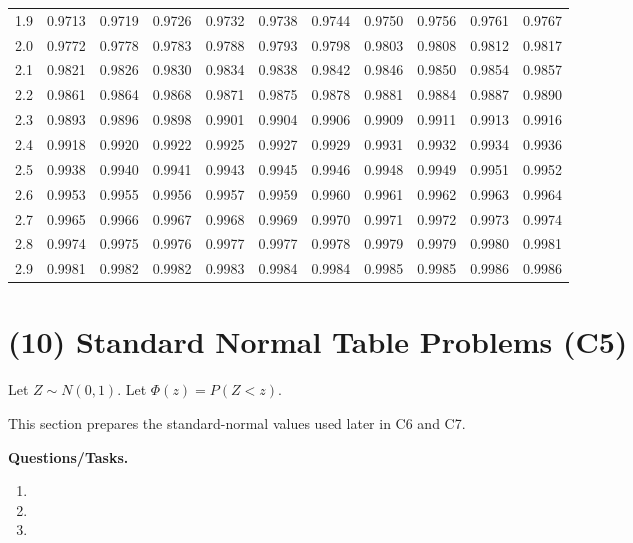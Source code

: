 \begin{center}
\begin{tabular}{c|cccccccccc}
		1.9 & 0.9713 & 0.9719 & 0.9726 & 0.9732 & 0.9738 & 0.9744 & 0.9750 & 0.9756 & 0.9761 & 0.9767\\
		2.0 & 0.9772 & 0.9778 & 0.9783 & 0.9788 & 0.9793 & 0.9798 & 0.9803 & 0.9808 & 0.9812 & 0.9817\\
		2.1 & 0.9821 & 0.9826 & 0.9830 & 0.9834 & 0.9838 & 0.9842 & 0.9846 & 0.9850 & 0.9854 & 0.9857\\
		2.2 & 0.9861 & 0.9864 & 0.9868 & 0.9871 & 0.9875 & 0.9878 & 0.9881 & 0.9884 & 0.9887 & 0.9890\\
		2.3 & 0.9893 & 0.9896 & 0.9898 & 0.9901 & 0.9904 & 0.9906 & 0.9909 & 0.9911 & 0.9913 & 0.9916\\
		2.4 & 0.9918 & 0.9920 & 0.9922 & 0.9925 & 0.9927 & 0.9929 & 0.9931 & 0.9932 & 0.9934 & 0.9936\\
		2.5 & 0.9938 & 0.9940 & 0.9941 & 0.9943 & 0.9945 & 0.9946 & 0.9948 & 0.9949 & 0.9951 & 0.9952\\
		2.6 & 0.9953 & 0.9955 & 0.9956 & 0.9957 & 0.9959 & 0.9960 & 0.9961 & 0.9962 & 0.9963 & 0.9964\\
		2.7 & 0.9965 & 0.9966 & 0.9967 & 0.9968 & 0.9969 & 0.9970 & 0.9971 & 0.9972 & 0.9973 & 0.9974\\
		2.8 & 0.9974 & 0.9975 & 0.9976 & 0.9977 & 0.9977 & 0.9978 & 0.9979 & 0.9979 & 0.9980 & 0.9981\\
		2.9 & 0.9981 & 0.9982 & 0.9982 & 0.9983 & 0.9984 & 0.9984 & 0.9985 & 0.9985 & 0.9986 & 0.9986
	\end{tabular}
\end{center}

	\section{(10) Standard Normal Table Problems (C5)}
\label{sec:standard-normal-table-problems-c5}

Let \(Z\sim N(0,1)\). Let \(\Phi(z)=P(Z<z)\).

This section prepares the standard-normal values used later in C6 and C7.

\textbf{Questions/Tasks.}
\begin{enumerate}[label=\textbf{\alph*)}]
	\item {}
	\item {}
	\item {}
\end{enumerate}

